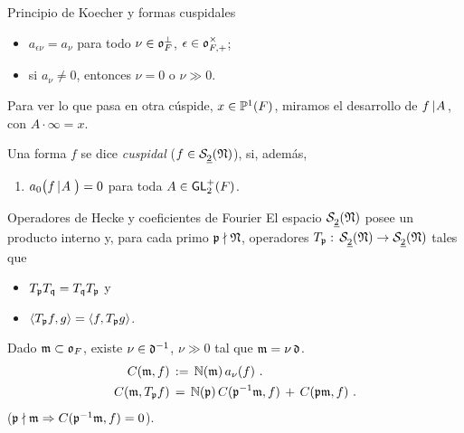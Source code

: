 \begin{frame}{Principio de Koecher y formas cuspidales}
	\begin{teoPrincipioKoecher}\label{thm:principiokoecher}
		\begin{itemize}
			\item $a_{\epsilon\nu}= a_{\nu}$ para todo
				$\nu\in\oka F^{\perp}$,
				$\epsilon\in\oka{F,+}^\times$;
			\item si $a_{\nu}\not=0$, entonces $\nu=0$ o
				$\nu\gg 0$.
		\end{itemize}
	\end{teoPrincipioKoecher}

	Para ver lo que pasa en otra c\'{u}spide, $x\in\bb{P}^{1}(F)$, miramos
	el desarrollo de $f\operadormatrices{\null}{A}$, con
	$A\cdot\infty=x$.
	\begin{defFormaHilbertClasica}\label{def:formahilbertclasicacuspidal}
		Una forma $f$ se dice \emph{cuspidal}
		($f\in\spitzH{2}{\frak{N}}$), si, adem\'{a}s,
		\begin{enumerate}
			\conti
			\item\label{def:formahilbertclasica:cuspidal}
				\begin{math}
					a_{0}\big(f\operadormatrices{%
						\null}{A}\big)=0
				\end{math} para toda $A\in\GLtp[2](F)$.
			\seti
		\end{enumerate}
	\end{defFormaHilbertClasica}
\end{frame}

\begin{frame}{Operadores de Hecke y coeficientes de Fourier}
	El espacio $\spitzH2{\frak N}$ posee un producto interno y, para cada
	primo $\frak p\nmid\frak N$, operadores
	\begin{math}
		T_{\frak p}:\,\spitzH2{\frak N}\rightarrow \spitzH2{\frak N}
	\end{math} tales que
	\begin{itemize}
		\item $T_{\frak p}T_{\frak q}=T_{\frak q}T_{\frak p}$ y
		\item
			\begin{math}
				\langle T_{\frak p}f,g\rangle=
					\langle f,T_{\frak p}g\rangle
			\end{math}.
	\end{itemize}
	Dado $\frak{m}\subset\oka{F}$, existe $\nu\in\diferente^{-1}$,
	$\nu\gg0$ tal que $\frak{m}=\nu\,\diferente$.
	\begin{align*}
		C(\frak m,f) & \,:=\,\idnorm(\frak m)\,a_\nu(f)
		\text{ .} \\
		C(\frak m,T_{\frak p}f) & \,=\,
			\idnorm(\frak p)\,C(\frak{p}^{-1}\frak m,f)\,+\,
				C(\frak p\frak m,f)
		\text{ .}
	\end{align*}
	($\frak p\nmid\frak m\Rightarrow C(\frak{p}^{-1}\frak m,f)=0$).
\end{frame}

